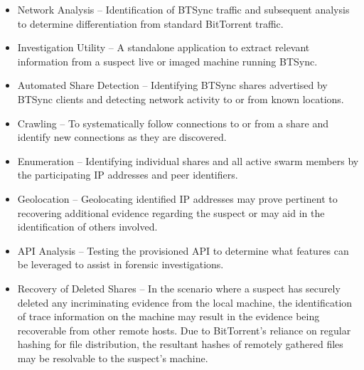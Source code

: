 \documentclass[final,5p,times,twocolumn]{elsarticle}
\begin{document}
\begin{itemize}
\item Network Analysis -- Identification of BTSync traffic and subsequent analysis to determine differentiation from standard BitTorrent traffic.
\item Investigation Utility -- A standalone application to extract relevant information from a suspect live or imaged machine running BTSync.
\item Automated Share Detection -- Identifying BTSync shares advertised by BTSync clients and detecting network activity to or from known locations.
\item Crawling -- To systematically follow connections to or from a share and identify new connections as they are discovered.
\item Enumeration -- Identifying individual shares and all active swarm members by the participating IP addresses and peer identifiers.
\item Geolocation -- Geolocating identified IP addresses may prove pertinent to recovering additional evidence regarding the suspect or may aid in the identification of others involved.
\item API Analysis -- Testing the provisioned API to determine what features can be leveraged to assist in forensic investigations.
\item Recovery of Deleted Shares -- In the scenario where a suspect has securely deleted any incriminating evidence from the local machine, the identification of trace information on the machine may result in the evidence being recoverable from other remote hosts. Due to BitTorrent's reliance on regular hashing for file distribution, the resultant hashes of remotely gathered files may be resolvable to the suspect's machine.
\end{itemize}



\end{document}
